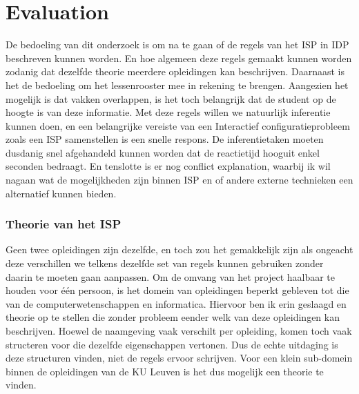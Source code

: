 \chapter{Evaluation}
\label{cha:evaluation}
De bedoeling van dit onderzoek is om na te gaan of de regels van het ISP in IDP beschreven kunnen worden. En hoe algemeen deze regels gemaakt kunnen worden zodanig dat dezelfde theorie meerdere opleidingen kan beschrijven. Daarnaast is het de bedoeling om het lessenrooster mee in rekening te brengen. Aangezien het mogelijk is dat vakken overlappen, is het toch belangrijk dat de student op de hoogte is van deze informatie. Met deze regels willen we natuurlijk inferentie kunnen doen, en een belangrijke vereiste van een Interactief configuratieprobleem zoals een ISP samenstellen is een snelle respons. De inferentietaken moeten dusdanig snel afgehandeld kunnen worden dat de reactietijd hooguit enkel seconden bedraagt. En tenslotte is er nog conflict explanation, waarbij ik wil nagaan wat de mogelijkheden zijn binnen ISP en of andere externe technieken \cite{amilhastre2002consistency} een alternatief kunnen bieden.

\subsection{Theorie van het ISP}
Geen twee opleidingen zijn dezelfde, en toch zou het gemakkelijk zijn als ongeacht deze verschillen we telkens dezelfde set van regels kunnen gebruiken zonder daarin te moeten gaan aanpassen. Om de omvang van het project haalbaar te houden voor \'{e}\'{e}n persoon, is het domein van opleidingen beperkt gebleven tot die van de computerwetenschappen en informatica. Hiervoor ben ik erin geslaagd en theorie op te stellen die zonder probleem eender welk van deze opleidingen kan beschrijven. Hoewel de naamgeving vaak verschilt per opleiding, komen toch vaak structeren voor die dezelfde eigenschappen vertonen. Dus de echte uitdaging is deze structuren vinden, niet de regels ervoor schrijven. Voor een klein sub-domein binnen de opleidingen van de KU Leuven is het dus mogelijk een theorie te vinden. 

